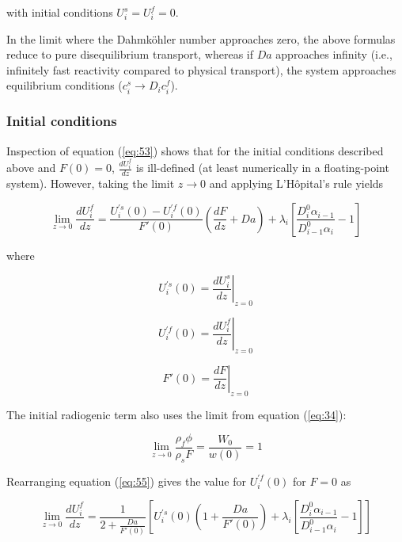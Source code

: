 \documentclass[11pt]{article}
\begin{document}
with initial conditions $U_i^s = U_i^f = 0$.

In the limit where the Dahmköhler number approaches zero, the above formulas reduce to pure disequilibrium transport, whereas if $Da$ approaches infinity (i.e., infinitely fast reactivity compared to physical transport), the system approaches equilibrium conditions ($c_i^s \rightarrow D_i c_i^f$).

    \hypertarget{initial-conditions}{%
\subsubsection{Initial conditions}\label{initial-conditions}}

Inspection of equation (\ref{eq:53}) shows that for the initial conditions described above and $F(0)=0$, $\frac{dU_i^f}{dz}$ is ill-defined (at least numerically in a floating-point system). However, taking the limit $z\rightarrow 0$ and applying L'Hôpital's rule yields

\begin{equation}
    \lim_{z\rightarrow 0} \frac{dU_i^f}{dz} = \frac{U_i^{'s}(0) - U_i^{'f}(0)}{F'(0)}\left(\frac{dF}{dz} + Da\right) +  \lambda_i \left[\frac{D_i^0 \alpha_{i-1}}{D_{i-1}^0 \alpha_i} - 1\right] \label{eq:55}
\end{equation}

where

\begin{equation}
    U_i^{'s}(0) = \left.\frac{dU_i^s}{dz}\right|_{z=0}\label{eq:56}
\end{equation}

\begin{equation}
    U_i^{'f}(0) = \left.\frac{dU_i^f}{dz}\right|_{z=0}\label{eq:57}
\end{equation}

\begin{equation}
    F'(0) = \left.\frac{dF}{dz}\right|_{z=0}\label{eq:58}
\end{equation}

The initial radiogenic term also uses the limit from equation (\ref{eq:34}):

\begin{equation}
    \lim_{z\rightarrow 0}  \frac{\rho_f \phi}{\rho_s F} = \frac{W_0}{w(0)} = 1\label{eq:59}
\end{equation}

Rearranging equation (\ref{eq:55}) gives the value for $U_i^{'f}(0)$ for $F=0$ as

\begin{equation}
    \lim_{z\rightarrow 0} \frac{dU_i^f}{dz} = \frac{1}{2 + \frac{Da}{F'(0)}}\left[U_i^{'s}(0)\left(1 + \frac{Da}{F'(0)}\right) +\lambda_i \left[\frac{D_i^0 \alpha_{i-1}}{D_{i-1}^0 \alpha_i} - 1\right] \right]\label{eq:60}
\end{equation}
\end{document}
